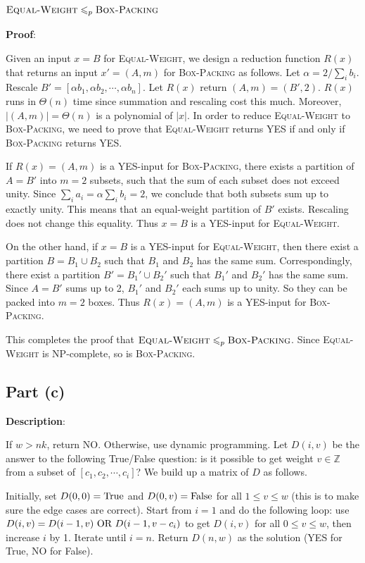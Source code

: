 \documentclass{article}
\begin{document}
\subsubsection{$\textsc{Equal-Weight}\leqslant_p\textsc{Box-Packing}$}
\noindent\textbf{Proof}:

Given an input $x=B$ for \textsc{Equal-Weight}, we design a reduction function $R(x)$ that returns an input $x'=(A,m)$ for \textsc{Box-Packing} as follows. Let $\alpha=2/\sum_ib_i$. Rescale $B'=[\alpha b_1,\alpha b_2,\cdots,\alpha b_n]$. Let $R(x)$ return $(A,m)=(B',2)$. $R(x)$ runs in $\Theta(n)$ time since summation and rescaling cost this much. Moreover, $|(A,m)|=\Theta(n)$ is a polynomial of $|x|$. In order to reduce \textsc{Equal-Weight} to \textsc{Box-Packing}, we need to prove that \textsc{Equal-Weight} returns YES if and only if \textsc{Box-Packing} returns YES.

If $R(x)=(A,m)$ is a YES-input for \textsc{Box-Packing}, there exists a partition of $A=B'$ into $m=2$ subsets, such that the sum of each subset does not exceed unity. Since $\sum_ia_i=\alpha\sum_ib_i=2$, we conclude that both subsets sum up to exactly unity. This means that an equal-weight partition of $B'$ exists. Rescaling does not change this equality. Thus $x=B$ is a YES-input for \textsc{Equal-Weight}.

On the other hand, if $x=B$ is a YES-input for \textsc{Equal-Weight}, then there exist a partition $B=B_1\cup B_2$ such that $B_1$ and $B_2$ has the same sum. Correspondingly, there exist a partition $B'=B_1'\cup B_2'$ such that $B_1'$ and $B_2'$ has the same sum. Since $A=B'$ sums up to 2, $B_1'$ and $B_2'$ each sums up to unity. So they can be packed into $m=2$ boxes. Thus $R(x)=(A,m)$ is a YES-input for \textsc{Box-Packing}.

This completes the proof that $\textsc{Equal-Weight}\leqslant_p\textsc{Box-Packing}$. Since \textsc{Equal-Weight} is NP-complete, so is \textsc{Box-Packing}.

\subsection{Part (c)}
\noindent\textbf{Description}:

If $w>nk$, return NO. Otherwise, use dynamic programming. Let $D(i,v)$ be the answer to the following True/False question: is it possible to get weight $v\in\mathbb{Z}$ from a subset of $[c_1,c_2,\cdots,c_i]$? We build up a matrix of $D$ as follows.

Initially, set $D(0,0)=\textup{True}$ and $D(0,v)=\textup{False}$ for all $1\leqslant v\leqslant w$ (this is to make sure the edge cases are correct). Start from $i=1$ and do the following loop: use $D(i,v)=D(i-1,v)\textup{ OR }D(i-1,v-c_i)$ to get $D(i,v)$ for all $0\leqslant v\leqslant w$, then increase $i$ by 1. Iterate until $i=n$. Return $D(n,w)$ as the solution (YES for True, NO for False).
\end{document}
